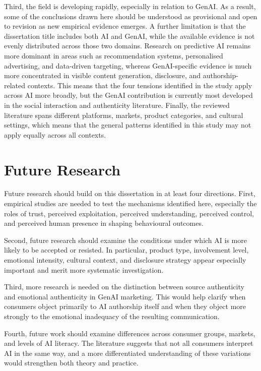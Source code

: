 Third, the field is developing rapidly, especially in relation to GenAI. As a result, some of the conclusions drawn here should be understood as provisional and open to revision as new empirical evidence emerges. A further limitation is that the dissertation title includes both AI and GenAI, while the available evidence is not evenly distributed across those two domains. Research on predictive AI remains more dominant in areas such as recommendation systems, personalised advertising, and data-driven targeting, whereas GenAI-specific evidence is much more concentrated in visible content generation, disclosure, and authorship-related contexts. This means that the four tensions identified in the study apply across AI more broadly, but the GenAI contribution is currently most developed in the social interaction and authenticity literature. Finally, the reviewed literature spans different platforms, markets, product categories, and cultural settings, which means that the general patterns identified in this study may not apply equally across all contexts.

\section{Future Research}
Future research should build on this dissertation in at least four directions. First, empirical studies are needed to test the mechanisms identified here, especially the roles of trust, perceived exploitation, perceived understanding, perceived control, and perceived human presence in shaping behavioural outcomes.

Second, future research should examine the conditions under which AI is more likely to be accepted or resisted. In particular, product type, involvement level, emotional intensity, cultural context, and disclosure strategy appear especially important and merit more systematic investigation.

Third, more research is needed on the distinction between source authenticity and emotional authenticity in GenAI marketing. This would help clarify when consumers object primarily to AI authorship itself and when they object more strongly to the emotional inadequacy of the resulting communication.

Fourth, future work should examine differences across consumer groups, markets, and levels of AI literacy. The literature suggests that not all consumers interpret AI in the same way, and a more differentiated understanding of these variations would strengthen both theory and practice.

